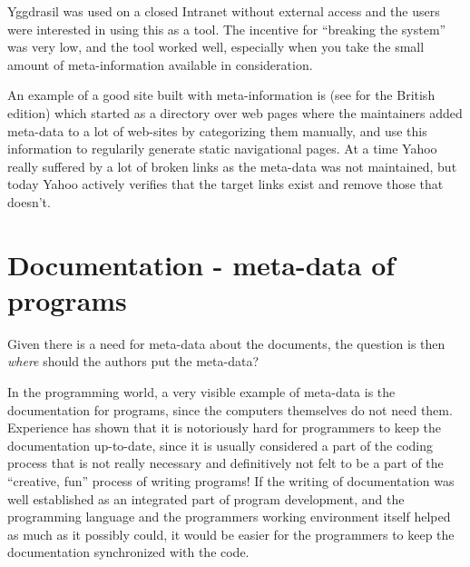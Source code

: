 Yggdrasil was used on a closed Intranet without external
access and the users were interested in using this as a
tool.  The incentive for ``breaking the system'' was very
low, and the tool worked well, especially when you take the
small amount of meta-information available in consideration.



An example of a good site built with meta-information is
 (see  for the
British edition) which started as a directory over web pages where the
maintainers added meta-data to a lot of web-sites by categorizing them
manually, and use this information to regularily generate static
navigational pages.  At a time Yahoo really suffered by a lot of
broken links as the meta-data was not maintained, but today Yahoo
actively verifies that the target links exist and remove those that
doesn't.


\section{Documentation - meta-data of programs}


Given there is a need for meta-data about the documents, the question
is then \textit{where} should the authors put the meta-data?


In the programming world, a very visible example of meta-data is the
documentation for programs, since the computers themselves do not need
them.  Experience has shown that it is notoriously hard for
programmers to keep the documentation up-to-date, since it is usually
considered a part of the coding process that is not really necessary
and definitively not felt to be a part of the ``creative, fun''
process of writing programs!  If the writing of documentation was well
established as an integrated part of program development, and the
programming language and the programmers working environment itself
helped as much as it possibly could, it would be easier for the
programmers to keep the documentation synchronized with the code.

